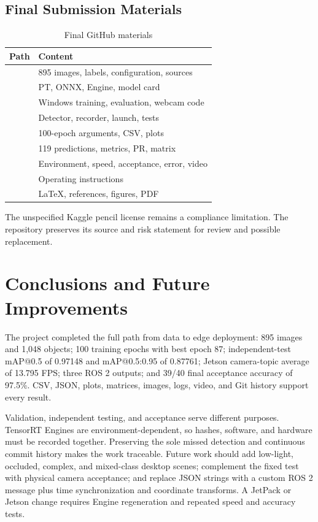 \documentclass[UTF8,zihao=-4,scheme=chinese,fontset=none]{ctexart}
\begin{document}
\subsection{Final Submission Materials}
\begin{table}[H]\centering\caption{Final GitHub materials}\begin{tabularx}{\textwidth}{Y Y}\toprule Path & Content\\\midrule {} & 895 images, labels, configuration, sources\\  & PT, ONNX, Engine, model card\\  & Windows training, evaluation, webcam code\\  & Detector, recorder, launch, tests\\  & 100-epoch arguments, CSV, plots\\  & 119 predictions, metrics, PR, matrix\\  & Environment, speed, acceptance, error, video\\  & Operating instructions\\  & LaTeX, references, figures, PDF\\\bottomrule\end{tabularx}\end{table}
The unspecified Kaggle pencil license remains a compliance limitation. The repository preserves its source and risk statement for review and possible replacement.

\section{Conclusions and Future Improvements}
The project completed the full path from data to edge deployment: 895 images and 1,048 objects; 100 training epochs with best epoch 87; independent-test mAP@0.5 of 0.97148 and mAP@0.5:0.95 of 0.87761; Jetson camera-topic average of 13.795 FPS; three ROS 2 outputs; and 39/40 final acceptance accuracy of 97.5\%. CSV, JSON, plots, matrices, images, logs, video, and Git history support every result.

Validation, independent testing, and acceptance serve different purposes. TensorRT Engines are environment-dependent, so hashes, software, and hardware must be recorded together. Preserving the sole missed detection and continuous commit history makes the work traceable. Future work should add low-light, occluded, complex, and mixed-class desktop scenes; complement the fixed test with physical camera acceptance; and replace JSON strings with a custom ROS 2 message plus time synchronization and coordinate transforms. A JetPack or Jetson change requires Engine regeneration and repeated speed and accuracy tests.
\end{document}

